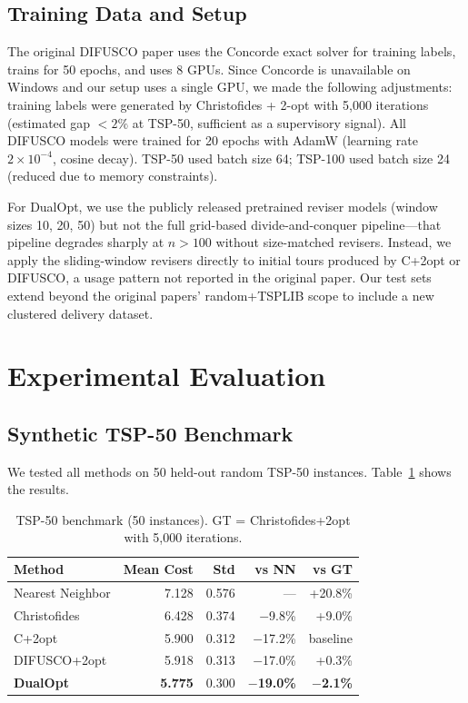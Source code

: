\documentclass[11pt,a4paper]{article}
\begin{document}
\subsection{Training Data and Setup}

The original DIFUSCO paper uses the Concorde exact solver for training labels, trains for 50 epochs, and uses 8 GPUs. Since Concorde is unavailable on Windows and our setup uses a single GPU, we made the following adjustments: training labels were generated by Christofides + 2-opt with 5,000 iterations (estimated gap $<2\%$ at TSP-50, sufficient as a supervisory signal). All DIFUSCO models were trained for 20 epochs with AdamW (learning rate $2\times10^{-4}$, cosine decay). TSP-50 used batch size 64; TSP-100 used batch size 24 (reduced due to memory constraints).

For DualOpt, we use the publicly released pretrained reviser models (window sizes 10, 20, 50) but not the full grid-based divide-and-conquer pipeline---that pipeline degrades sharply at $n>100$ without size-matched revisers. Instead, we apply the sliding-window revisers directly to initial tours produced by C+2opt or DIFUSCO, a usage pattern not reported in the original paper. Our test sets extend beyond the original papers' random+TSPLIB scope to include a new clustered delivery dataset.

\section{Experimental Evaluation}

\subsection{Synthetic TSP-50 Benchmark}

We tested all methods on 50 held-out random TSP-50 instances. Table~\ref{tab:tsp50} shows the results.

\begin{table}[H]
\centering
\footnotesize
\caption{TSP-50 benchmark (50 instances). GT = Christofides+2opt with 5,000 iterations.}
\label{tab:tsp50}
\begin{tabular}{@{}lrrrr@{}}
\toprule
Method & Mean Cost & Std & vs NN & vs GT \\
\midrule
Nearest Neighbor & 7.128 & 0.576 & --- & +20.8\% \\
Christofides & 6.428 & 0.374 & $-$9.8\% & +9.0\% \\
C+2opt & 5.900 & 0.312 & $-$17.2\% & baseline \\
DIFUSCO+2opt & 5.918 & 0.313 & $-$17.0\% & +0.3\% \\
\textbf{DualOpt} & \textbf{5.775} & 0.300 & \textbf{$-$19.0\%} & \textbf{$-$2.1\%} \\
\bottomrule
\end{tabular}
\end{table}
\end{document}
